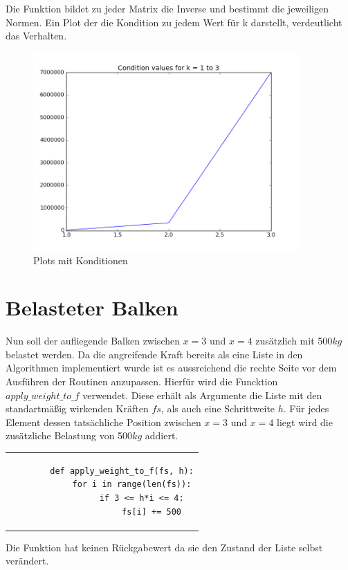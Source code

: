 \documentclass[12pt,titlepage]{article}
\begin{document}
				\newline \newline
				Die Funktion bildet zu jeder Matrix die Inverse und bestimmt die jeweiligen Normen.
				\newpage
				Ein Plot der die Kondition zu jedem Wert für k darstellt, verdeutlicht das Verhalten.
				\begin{figure}[H] 
					 \centering
					 \includegraphics[width=0.9\textwidth]{conds.png}
					 \caption{Plots mit Konditionen}
					 \label{fig:Bild4}
				\end{figure}
				
\section{Belasteter Balken}

	Nun soll der aufliegende Balken zwischen $x=3$ und $x=4$ zusätzlich mit 500$kg$ belastet werden.
	Da die angreifende Kraft bereits als eine Liste in den Algorithmen implementiert wurde ist es aussreichend die rechte Seite vor
	dem Ausführen der Routinen anzupassen. Hierfür wird die Funcktion $apply\_weight\_to\_f$ verwendet. Diese erhält als Argumente die Liste mit
	den standartmäßig wirkenden Kräften $fs$, als auch eine Schrittweite $h$. Für jedes Element dessen tatsächliche Position zwischen $x=3$ und $x=4$ liegt
	wird die zusätzliche Belastung von 500$kg$ addiert. \newline \newline
	\begin{tabular}{c}
	\begin{lstlisting}
		def apply_weight_to_f(fs, h):
    		for i in range(len(fs)):
        		if 3 <= h*i <= 4:
            		fs[i] += 500
	\end{lstlisting}
	\end{tabular}
	\newline \newline
	Die Funktion hat keinen Rückgabewert da sie den Zustand der Liste selbst verändert.	
	
\end{document}
